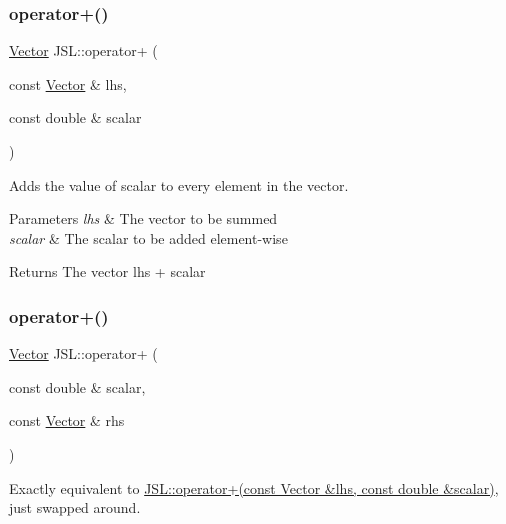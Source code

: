 \subsubsection{\texorpdfstring{operator+()}{operator+()}\hspace{0.1cm}{\footnotesize\ttfamily [2/6]}}
{\footnotesize\ttfamily \hyperlink{classJSL_1_1Vector}{Vector} J\+S\+L\+::operator+ (\begin{DoxyParamCaption}\item[{const \hyperlink{classJSL_1_1Vector}{Vector} \&}]{lhs,  }\item[{const double \&}]{scalar }\end{DoxyParamCaption})\hspace{0.3cm}{\ttfamily [inline]}}



Adds the value of scalar to every element in the vector. 


\begin{DoxyParams}{Parameters}
{\em lhs} & The vector to be summed \\
\hline
{\em scalar} & The scalar to be added element-\/wise \\
\hline
\end{DoxyParams}
\begin{DoxyReturn}{Returns}
The vector lhs + scalar 
\end{DoxyReturn}
\mbox{\label{namespaceJSL_ac5ceabb8b9e657c5e2d0faf9b20a36e8}} 
\subsubsection{\texorpdfstring{operator+()}{operator+()}\hspace{0.1cm}{\footnotesize\ttfamily [3/6]}}
{\footnotesize\ttfamily \hyperlink{classJSL_1_1Vector}{Vector} J\+S\+L\+::operator+ (\begin{DoxyParamCaption}\item[{const double \&}]{scalar,  }\item[{const \hyperlink{classJSL_1_1Vector}{Vector} \&}]{rhs }\end{DoxyParamCaption})\hspace{0.3cm}{\ttfamily [inline]}}



Exactly equivalent to \hyperlink{namespaceJSL_a4b293e2ac3df51113e80022cb3c2ac99}{J\+S\+L\+::operator+(const Vector \&lhs, const double \&scalar)}, just swapped around. 


